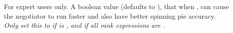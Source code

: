\begin{description}
\item[] \label{param:NegotiatorConsiderPreemption}
  For expert users only. A boolean value (defaults to ),
  that when ,
  can cause the negotiator to run
  faster and also have better spinning pie accuracy.
  \emph{Only set this to  if 
  is ,
  and if all  rank expressions are .}

\end{description}


% 
  



